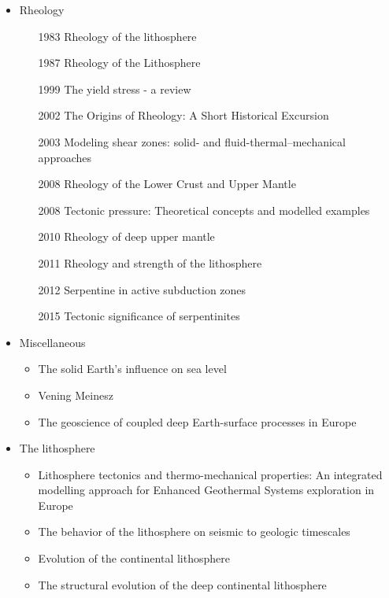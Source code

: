 \begin{itemize}
\item Rheology 
   \begin{itemize}
   \item [1983] Rheology of the lithosphere \cite{kirb83}
   \item [1987] Rheology of the Lithosphere \cite{kikr87}
   \item [1999] The yield stress - a review \cite{barn99}
   \item [2002] The Origins of Rheology: A Short Historical Excursion \cite{dora02}
   \item [2003] Modeling shear zones: solid- and fluid-thermal–mechanical approaches \cite{reyu03}
   \item [2008] Rheology of the Lower Crust and Upper Mantle \cite{budr08}
   \item [2008] Tectonic pressure: Theoretical concepts and modelled examples \cite{manc08}
   \item [2010] Rheology of deep upper mantle \cite{kara10}
   \item [2011] Rheology and strength of the lithosphere \cite{buro11}
   \item [2012] Serpentine in active subduction zones \cite{reyn12}
   \item [2015] Tectonic significance of serpentinites \cite{gusr15}
   \end{itemize}

\item Miscellaneous
   \begin{itemize}
   \item The solid Earth’s influence on sea level \cite{conr13}  
   \item Vening Meinesz \cite{vlaa89}
   \item The geoscience of coupled deep Earth-surface processes in Europe \cite{clzb07}
   \end{itemize}

\item The lithosphere
   \begin{itemize}
   \item Lithosphere tectonics and thermo-mechanical properties: An integrated modelling
         approach for Enhanced Geothermal Systems exploration in Europe \cite{clvz10}
   \item The behavior of the lithosphere on seismic to geologic timescales \cite{wazh13}
   \item Evolution of the continental lithosphere \cite{slee05}
   \item The structural evolution of the deep continental lithosphere \cite{comm17}
   \end{itemize}


\end{itemize}

